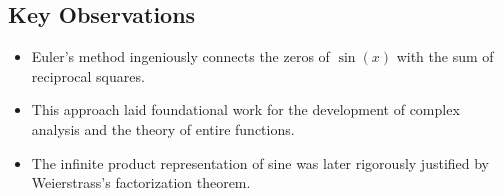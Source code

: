 \subsection{Key Observations}

\begin{itemize}

    \item Euler's method ingeniously connects the zeros of \( \sin(x) \) with the sum of reciprocal squares.

    \item This approach laid foundational work for the development of complex analysis and the theory of entire functions.

    \item The infinite product representation of sine was later rigorously justified by Weierstrass's factorization theorem.

\end{itemize}
